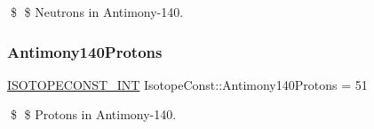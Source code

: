 \$ \$ Neutrons in Antimony-\/140. \mbox{\label{group___isotope_const-_antimony-_sb140_ga85c23ce090d5355d3f708f1f33edeb91}} 
\subsubsection{\texorpdfstring{Antimony140\+Protons}{Antimony140Protons}}
{\footnotesize\ttfamily \mbox{\hyperlink{group___isotope_const-_macros_ga5f18360b3e99483a35c32d789e62621c}{I\+S\+O\+T\+O\+P\+E\+C\+O\+N\+S\+T\+\_\+\+I\+NT}} Isotope\+Const\+::\+Antimony140\+Protons = 51}

\$ \$ Protons in Antimony-\/140. 